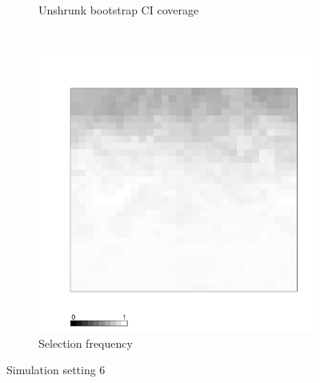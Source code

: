 \documentclass[authoryear, review, 11pt]{elsarticle}
\begin{document}
\begin{figure}
\begin{subfigure}[b]{0.45\textwidth}
		\caption{Unshrunk bootstrap CI coverage}
	\end{subfigure}%
	~ %
	\begin{subfigure}[b]{0.45\textwidth}
	\centering
		\includegraphics[width=\textwidth]{../../figures/simulation/X1.15.6.selection.pdf}
		\caption{Selection frequency}
	\end{subfigure}
	\caption{Simulation setting 6}
\end{figure}

\clearpage
\end{document}
